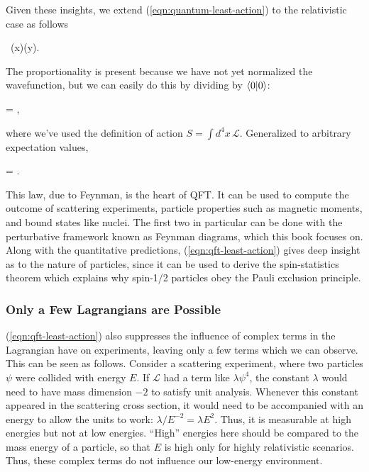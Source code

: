 Given these insights, we extend (\ref{eqn:quantum-least-action}) to the relativistic case as follows

\begin{e}
   \propto \int {}\psi\, \psi(x)\psi(y).
\end{e}
The proportionality is present because we have not yet normalized the wavefunction, but we can easily do this by dividing by $\braket{0|0}$:

\begin{e}
   = ,
\end{e}
where we've used the definition of action $S = \int d^4x\, \mathcal{L}$. Generalized to arbitrary expectation values,

\begin{e}
   = .
  \label{eqn:qft-least-action}
\end{e}

This law, due to Feynman, is the heart of QFT. It can be used to compute the outcome of scattering experiments, particle properties such as magnetic moments, and bound states like nuclei. The first two in particular can be done with the perturbative framework known as Feynman diagrams, which this book focuses on. Along with the quantitative predictions, (\ref{eqn:qft-least-action}) gives deep insight as to the nature of particles, since it can be used to derive the spin-statistics theorem which explains why spin-1/2 particles obey the Pauli exclusion principle.

\subsubsection*{Only a Few Lagrangians are Possible}

(\ref{eqn:qft-least-action}) also suppresses the influence of complex terms in the Lagrangian have on experiments, leaving only a few terms which we can observe. This can be seen as follows. Consider a scattering experiment, where two particles $\psi$ were collided with energy $E$. If $\mathcal{L}$ had a term like $\lambda \psi^4$, the constant $\lambda$ would need to have mass dimension $-2$ to satisfy unit analysis. Whenever this constant appeared in the scattering cross section, it would need to be accompanied with an energy to allow the units to work: $\lambda / E^{-2} = \lambda E^2$. Thus, it is measurable at high energies but not at low energies. ``High'' energies here should be compared to the mass energy of a particle, so that $E$ is high only for highly relativistic scenarios. Thus, these complex terms do not influence our low-energy environment.

